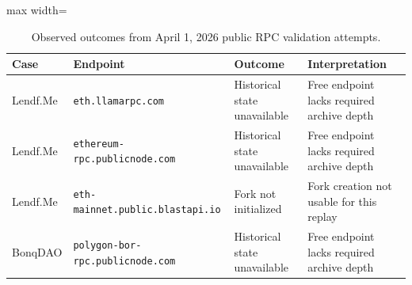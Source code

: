 \begin{table}[ht]
\centering
\caption{Observed outcomes from April 1, 2026 public RPC validation attempts.}
\label{tab:rpc-validation}
\begin{adjustbox}{max width=\textwidth}
\begin{tabular}{llll}
\toprule
\textbf{Case} & \textbf{Endpoint} & \textbf{Outcome} & \textbf{Interpretation} \\
\midrule
Lendf.Me & \texttt{eth.llamarpc.com} & Historical state unavailable & Free endpoint lacks required archive depth \\
Lendf.Me & \texttt{ethereum-rpc.publicnode.com} & Historical state unavailable & Free endpoint lacks required archive depth \\
Lendf.Me & \texttt{eth-mainnet.public.blastapi.io} & Fork not initialized & Fork creation not usable for this replay \\
BonqDAO & \texttt{polygon-bor-rpc.publicnode.com} & Historical state unavailable & Free endpoint lacks required archive depth \\
\bottomrule
\end{tabular}
\end{adjustbox}
\end{table}
